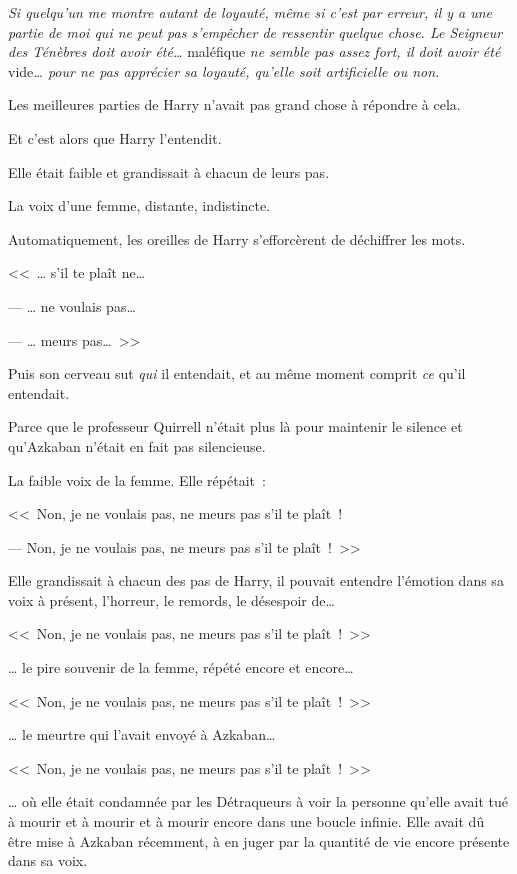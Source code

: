 \emph{Si quelqu'un me montre autant de loyauté, même si c'est par erreur, il y a une partie de moi qui ne peut pas s'empêcher de ressentir quelque chose. Le Seigneur des Ténèbres doit avoir été…} maléfique \emph{ne semble pas assez fort, il doit avoir été} vide\emph{… pour ne pas apprécier sa loyauté, qu'elle soit artificielle ou non.}

Les meilleures parties de Harry n'avait pas grand chose à répondre à cela.

Et c'est alors que Harry l'entendit.

Elle était faible et grandissait à chacun de leurs pas.

La voix d'une femme, distante, indistincte.

Automatiquement, les oreilles de Harry s'efforcèrent de déchiffrer les mots.

<<~… s'il te plaît ne…

--- … ne voulais pas…

--- … meurs pas…~>>

Puis son cerveau sut \emph{qui} il entendait, et au même moment comprit \emph{ce} qu'il entendait.

Parce que le professeur Quirrell n'était plus là pour maintenir le silence et qu'Azkaban n'était en fait pas silencieuse.

La faible voix de la femme. Elle répétait~:

<<~Non, je ne voulais pas, ne meurs pas s'il te plaît~!

--- Non, je ne voulais pas, ne meurs pas s'il te plaît~!~>>

Elle grandissait à chacun des pas de Harry, il pouvait entendre l'émotion dans sa voix à présent, l'horreur, le remords, le désespoir de…

<<~Non, je ne voulais pas, ne meurs pas s'il te plaît~!~>>

… le pire souvenir de la femme, répété encore et encore…

<<~Non, je ne voulais pas, ne meurs pas s'il te plaît~!~>>

… le meurtre qui l'avait envoyé à Azkaban…

<<~Non, je ne voulais pas, ne meurs pas s'il te plaît~!~>>

… où elle était condamnée par les Détraqueurs à voir la personne qu'elle avait tué à mourir et à mourir et à mourir encore dans une boucle infinie. Elle avait dû être mise à Azkaban récemment, à en juger par la quantité de vie encore présente dans sa voix.

